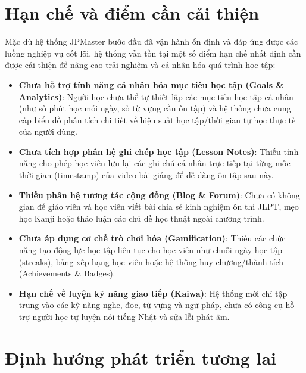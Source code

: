 \documentclass[../DoAn.tex]{subfiles}
\begin{document}
\section{Hạn chế và điểm cần cải thiện}
\label{section:5.2}

Mặc dù hệ thống JPMaster bước đầu đã vận hành ổn định và đáp ứng được các luồng nghiệp vụ cốt lõi, hệ thống vẫn tồn tại một số điểm hạn chế nhất định cần được cải thiện để nâng cao trải nghiệm và cá nhân hóa quá trình học tập:
\begin{itemize}
    \item \textbf{Chưa hỗ trợ tính năng cá nhân hóa mục tiêu học tập (Goals \& Analytics)}: Người học chưa thể tự thiết lập các mục tiêu học tập cá nhân (như số phút học mỗi ngày, số từ vựng cần ôn tập) và hệ thống chưa cung cấp biểu đồ phân tích chi tiết về hiệu suất học tập/thời gian tự học thực tế của người dùng.
    \item \textbf{Chưa tích hợp phân hệ ghi chép học tập (Lesson Notes)}: Thiếu tính năng cho phép học viên lưu lại các ghi chú cá nhân trực tiếp tại từng mốc thời gian (timestamp) của video bài giảng để dễ dàng ôn tập sau này.
    \item \textbf{Thiếu phân hệ tương tác cộng đồng (Blog \& Forum)}: Chưa có không gian để giáo viên và học viên viết bài chia sẻ kinh nghiệm ôn thi JLPT, mẹo học Kanji hoặc thảo luận các chủ đề học thuật ngoài chương trình.
    \item \textbf{Chưa áp dụng cơ chế trò chơi hóa (Gamification)}: Thiếu các chức năng tạo động lực học tập liên tục cho học viên như chuỗi ngày học tập (streaks), bảng xếp hạng học viên hoặc hệ thống huy chương/thành tích (Achievements \& Badges).
    \item \textbf{Hạn chế về luyện kỹ năng giao tiếp (Kaiwa)}: Hệ thống mới chỉ tập trung vào các kỹ năng nghe, đọc, từ vựng và ngữ pháp, chưa có công cụ hỗ trợ người học tự luyện nói tiếng Nhật và sửa lỗi phát âm.
\end{itemize}

\section{Định hướng phát triển tương lai}
\label{section:5.3}
\end{document}
